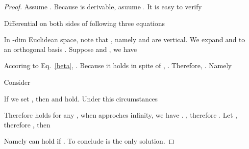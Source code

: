 \documentclass{article}
\begin{document}
\begin{proof}
Assume . Because  is derivable, asuume . It is easy to verify


Differential on both sides of following three equations


In -dim Euclidean space, note that , namely  and  are vertical. We expand  and  to an orthogonal basis . Suppose  and , we have


Accoring to Eq.~\ref{beta}, . Because it holds in spite of , . Therefore, . Namely


Consider 


If we set , then  and  hold. Under this circumstances


Therefore  holds for any , when  approches infinity, we have .
, therefore . Let , therefore , then


Namely  can hold if . To conclude  is the only solution.
\end{proof}
\end{document}
